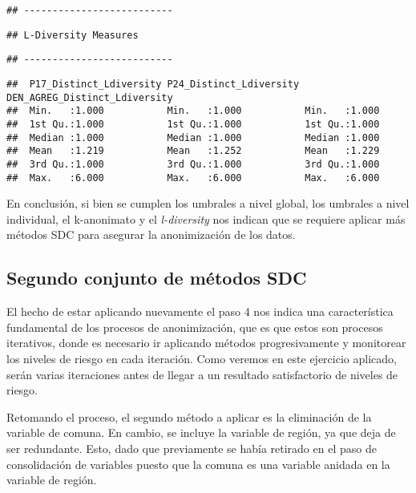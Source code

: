 \documentclass[
]{book}
\theoremstyle{definition}
\theoremstyle{definition}
\theoremstyle{definition}
\theoremstyle{definition}
\theoremstyle{remark}
\begin{document}
\begin{verbatim}
## --------------------------
\end{verbatim}

\begin{verbatim}
## L-Diversity Measures
\end{verbatim}

\begin{verbatim}
## --------------------------
\end{verbatim}

\begin{verbatim}
##  P17_Distinct_Ldiversity P24_Distinct_Ldiversity DEN_AGREG_Distinct_Ldiversity
##  Min.   :1.000           Min.   :1.000           Min.   :1.000                
##  1st Qu.:1.000           1st Qu.:1.000           1st Qu.:1.000                
##  Median :1.000           Median :1.000           Median :1.000                
##  Mean   :1.219           Mean   :1.252           Mean   :1.229                
##  3rd Qu.:1.000           3rd Qu.:1.000           3rd Qu.:1.000                
##  Max.   :6.000           Max.   :6.000           Max.   :6.000
\end{verbatim}

En conclusión, si bien se cumplen los umbrales a nivel global, los umbrales a nivel individual, el k-anonimato y el \emph{l-diversity} nos indican que se requiere aplicar más métodos SDC para asegurar la anonimización de los datos.

\hypertarget{segundo-conjunto-de-muxe9todos-sdc}{%
\subsection{Segundo conjunto de métodos SDC}\label{segundo-conjunto-de-muxe9todos-sdc}}

El hecho de estar aplicando nuevamente el paso 4 nos indica una característica fundamental de los procesos de anonimización, que es que estos son procesos iterativos, donde es necesario ir aplicando métodos progresivamente y monitorear los niveles de riesgo en cada iteración. Como veremos en este ejercicio aplicado, serán varias iteraciones antes de llegar a un resultado satisfactorio de niveles de riesgo.

Retomando el proceso, el segundo método a aplicar es la eliminación de la variable de comuna. En cambio, se incluye la variable de región, ya que deja de ser redundante. Esto, dado que previamente se había retirado en el paso de consolidación de variables puesto que la comuna es una variable anidada en la variable de región.
\end{document}
